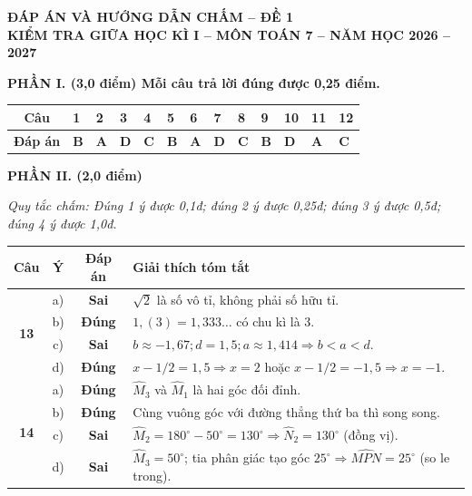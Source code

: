 \documentclass[11pt,a4paper]{article}
\begin{document}
\begin{center}
  \textbf{\large ĐÁP ÁN VÀ HƯỚNG DẪN CHẤM -- ĐỀ 1}\\[1mm]
  \textbf{\large KIỂM TRA GIỮA HỌC KÌ I -- MÔN TOÁN 7 -- NĂM HỌC 2026 -- 2027}
\end{center}

\vspace{1mm}
\noindent\textbf{\large PHẦN I. (3,0 điểm) Mỗi câu trả lời đúng được 0,25 điểm.}
\vspace{1mm}

\noindent
\begin{tabularx}{\linewidth}{|c|*{12}{Y|}}
\hline
\textbf{Câu} & 1 & 2 & 3 & 4 & 5 & 6 & 7 & 8 & 9 & 10 & 11 & 12 \\ \hline
\textbf{Đáp án} & \textbf{B} & \textbf{A} & \textbf{D} & \textbf{C} & \textbf{B} & \textbf{A} & \textbf{D} & \textbf{C} & \textbf{B} & \textbf{D} & \textbf{A} & \textbf{C} \\ \hline
\end{tabularx}

\vspace{2.5mm}
\noindent\textbf{\large PHẦN II. (2,0 điểm)}
\vspace{0.5mm}

\noindent\textit{Quy tắc chấm: Đúng 1 ý được 0,1đ; đúng 2 ý được 0,25đ; đúng 3 ý được 0,5đ; đúng 4 ý được 1,0đ.}

\vspace{1mm}
\noindent
\begin{tabularx}{\linewidth}{|c|c|c|X|}
\hline
\textbf{Câu} & \textbf{Ý} & \textbf{Đáp án} & \textbf{Giải thích tóm tắt} \\ \hline
\multirow{4}{*}{\textbf{13}} & a) & \textbf{Sai} & $\sqrt{2}$ là số vô tỉ, không phải số hữu tỉ. \\ \cline{2-4}
& b) & \textbf{Đúng} & $1,(3) = 1,333\dots$ có chu kì là 3. \\ \cline{2-4}
& c) & \textbf{Sai} & $b \approx -1,67; d = 1,5; a \approx 1,414 \Rightarrow b < a < d$. \\ \cline{2-4}
& d) & \textbf{Đúng} & $x - 1/2 = 1,5 \Rightarrow x = 2$ hoặc $x - 1/2 = -1,5 \Rightarrow x = -1$. \\ \hline
\multirow{4}{*}{\textbf{14}} & a) & \textbf{Đúng} & $\widehat{M}_3$ và $\widehat{M}_1$ là hai góc đối đỉnh. \\ \cline{2-4}
& b) & \textbf{Đúng} & Cùng vuông góc với đường thẳng thứ ba thì song song. \\ \cline{2-4}
& c) & \textbf{Sai} & $\widehat{M}_2 = 180^\circ - 50^\circ = 130^\circ \Rightarrow \widehat{N}_2 = 130^\circ$ (đồng vị). \\ \cline{2-4}
& d) & \textbf{Sai} & $\widehat{M}_3 = 50^\circ$; tia phân giác tạo góc $25^\circ \Rightarrow \widehat{MPN} = 25^\circ$ (so le trong). \\ \hline
\end{tabularx}
\end{document}

